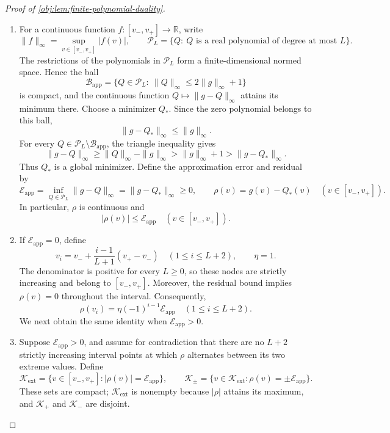 \begin{proof}[Proof of \cref{obj:lem:finite-polynomial-duality}]
\begin{enumerate}
\item For a continuous function \(f:[v_-,v_+]\to\mathbb R\), write
\[
\|f\|_\infty=\sup_{v\in[v_-,v_+]}|f(v)|,
\qquad
\mathscr P_L=\{Q:\ Q\text{ is a real polynomial of degree at most }L\}.
\]
The restrictions of the polynomials in \(\mathscr P_L\) form a finite-dimensional normed space. Hence the ball
\[
\mathscr B_{\mathrm{app}}
=
\{Q\in\mathscr P_L:\ \|Q\|_\infty\le 2\|g\|_\infty+1\}
\]
is compact, and the continuous function \(Q\mapsto\|g-Q\|_\infty\) attains its minimum there. Choose a minimizer \(Q_*\). Since the zero polynomial belongs to this ball,
\[
\|g-Q_*\|_\infty\le \|g\|_\infty.
\]
For every \(Q\in\mathscr P_L\setminus\mathscr B_{\mathrm{app}}\), the triangle inequality gives
\[
\|g-Q\|_\infty
\ge \|Q\|_\infty-\|g\|_\infty
> \|g\|_\infty+1
> \|g-Q_*\|_\infty.
\]
Thus \(Q_*\) is a global minimizer. Define the approximation error and residual by
\[
\mathcal E_{\mathrm{app}}
=
\inf_{Q\in\mathscr P_L}\|g-Q\|_\infty
=
\|g-Q_*\|_\infty\ge0,
\qquad
\rho(v)=g(v)-Q_*(v)
\quad(v\in[v_-,v_+]).
\]
In particular, \(\rho\) is continuous and
\[
|\rho(v)|\le\mathcal E_{\mathrm{app}}
\quad(v\in[v_-,v_+]).
\]

\item If \(\mathcal E_{\mathrm{app}}=0\), define
\[
v_i=v_-+\frac{i-1}{L+1}(v_+-v_-)
\quad(1\le i\le L+2),
\qquad
\eta=1.
\]
The denominator is positive for every \(L\ge0\), so these nodes are strictly increasing and belong to \([v_-,v_+]\). Moreover, the residual bound implies \(\rho(v)=0\) throughout the interval. Consequently,
\[
\rho(v_i)=\eta(-1)^{i-1}\mathcal E_{\mathrm{app}}
\quad(1\le i\le L+2).
\]
We next obtain the same identity when \(\mathcal E_{\mathrm{app}}>0\).

\item Suppose \(\mathcal E_{\mathrm{app}}>0\), and assume for contradiction that there are no \(L+2\) strictly increasing interval points at which \(\rho\) alternates between its two extreme values. Define
\[
\mathcal K_{\mathrm{ext}}
=
\{v\in[v_-,v_+]:|\rho(v)|=\mathcal E_{\mathrm{app}}\},
\qquad
\mathcal K_\pm
=
\{v\in\mathcal K_{\mathrm{ext}}:
\rho(v)=\pm\mathcal E_{\mathrm{app}}\}.
\]
These sets are compact; \(\mathcal K_{\mathrm{ext}}\) is nonempty because \(|\rho|\) attains its maximum, and \(\mathcal K_+\) and \(\mathcal K_-\) are disjoint.


\end{enumerate}
\end{proof}
